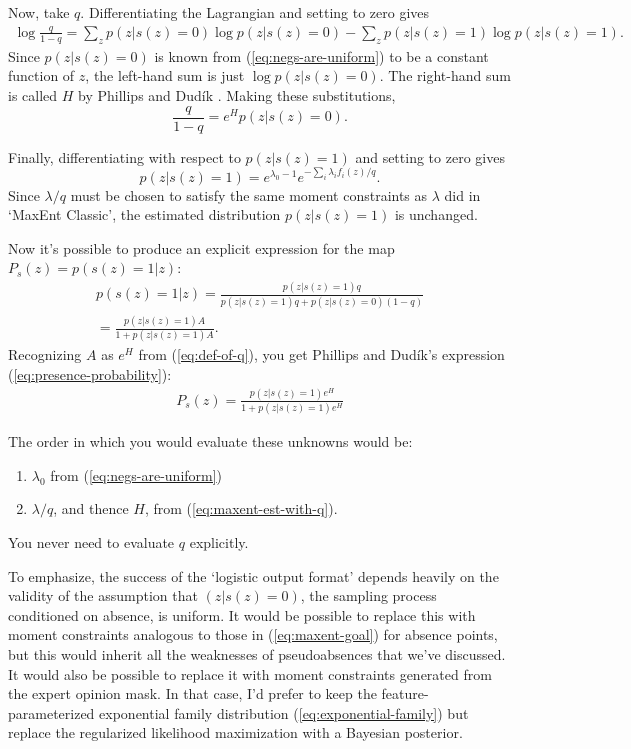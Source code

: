 \bigskip
Now, take $q$. Differentiating the Lagrangian and setting to zero gives
\begin{eqnarray*}
    \log\frac{q}{1-q} = \sum_z p(z|s(z)=0) \log p(z|s(z)=0)-\sum_z p(z|s(z)=1) \log p(z|s(z)=1).
\end{eqnarray*}
Since $p(z|s(z)=0)$ is known from (\ref{eq:negs-are-uniform}) to be a constant function of $z$, the left-hand sum is just $\log p(z|s(z)=0)$. The right-hand sum is called $H$ by Phillips and Dud\'ik \cite{Phillips:2008p12219}. Making these substitutions,
\begin{equation}
    \label{eq:def-of-q}
    \frac{q}{1-q} = e^Hp(z|s(z)=0).
\end{equation}

\bigskip
Finally, differentiating with respect to $p(z|s(z)=1)$ and setting to zero gives
\begin{equation}
    \label{eq:maxent-est-with-q} 
    p(z|s(z)=1)=e^{\lambda_0-1}e^{-\sum_i \lambda_i f_i(z)/q}.
\end{equation}
Since $\lambda/q$ must be chosen to satisfy the same moment constraints as $\lambda$ did in `MaxEnt Classic', the estimated distribution $p(z|s(z)=1)$ is unchanged.

\bigskip
Now it's possible to produce an explicit expression for the map $P_s(z)=p(s(z)=1|z)$:
\begin{eqnarray*}
    p(s(z)=1|z) = \frac{p(z|s(z)=1)q}{p(z|s(z)=1)q+p(z|s(z)=0)(1-q)}\\
    =\frac{p(z|s(z)=1)A}{1+p(z|s(z)=1)A}.
\end{eqnarray*}
Recognizing $A$ as $e^H$ from (\ref{eq:def-of-q}), you get Phillips and Dud\'ik's expression (\ref{eq:presence-probability}):
\begin{eqnarray*}
    P_s(z) = \frac{p(z|s(z)=1)e^H}{1+p(z|s(z)=1)e^H}
\end{eqnarray*}

\bigskip
The order in which you would evaluate these unknowns would be:
\begin{enumerate}
    \item $\lambda_0$ from (\ref{eq:negs-are-uniform})
    \item $\lambda/q$, and thence $H$, from (\ref{eq:maxent-est-with-q}).
\end{enumerate}
You never need to evaluate $q$ explicitly.

\bigskip
To emphasize, the success of the `logistic output format' depends heavily on the validity of the assumption that $(z|s(z)=0)$, the sampling process conditioned on absence, is uniform. It would be possible to replace this with moment constraints analogous to those in (\ref{eq:maxent-goal}) for absence points, but this would inherit all the weaknesses of pseudoabsences that we've discussed. It would also be possible to replace it with moment constraints generated from the expert opinion mask. In that case, I'd prefer to keep the feature-parameterized exponential family distribution (\ref{eq:exponential-family}) but replace the regularized likelihood maximization with a Bayesian posterior.